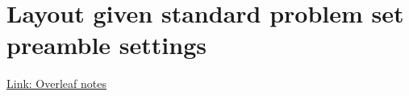 
\usepackage{layout}


\fancyhead[LE]{\thepage}


\section{Layout given standard problem set preamble settings}
\href{https://www.overleaf.com/learn/latex/Page_size_and_margins}{Link: Overleaf notes}

\layout


